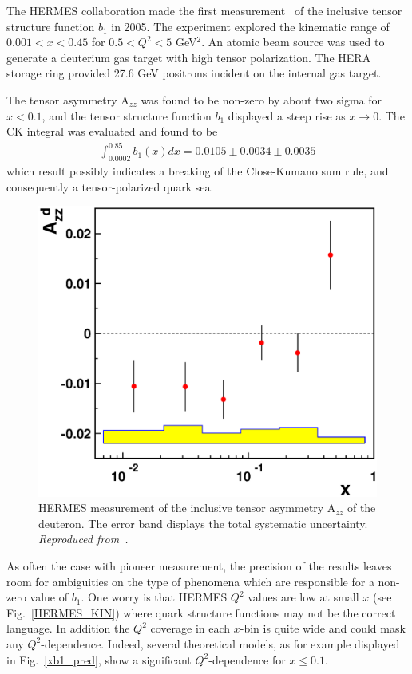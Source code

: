 \label{B1DATASECTION}
The HERMES collaboration  made the first measurement~\cite{Airapetian:2005cb} of
the inclusive tensor structure function $b_1$ in 2005.
The experiment explored the kinematic range of $0.001<x<0.45$ for  $0.5<Q^2<5$ GeV$^2$.  
An atomic beam source was used to generate a deuterium gas target with high tensor polarization.  
The HERA storage ring provided 27.6 GeV positrons incident on the internal gas target.

The tensor asymmetry A$_{zz}$  was found to be non-zero by about two sigma  for $x < 0.1$, and 
the tensor structure function  $b_1$ displayed a steep rise as $x\to 0$.
The CK integral was evaluated and found to be 
\begin{eqnarray}
\int_{0.0002}^{0.85} b_1(x) dx = 0.0105 \pm 0.0034 \pm 0.0035
\end{eqnarray}
which result possibly indicates a breaking of the Close-Kumano sum rule, and consequently a 
tensor-polarized quark sea.
%
%
\begin{figure}[h]
\begin{center}
\includegraphics[angle=0,width=4.in]{figs/azzfinal.eps}
\caption{\label{HERMES_AZZ} HERMES measurement of the inclusive tensor asymmetry A$_{zz}$ of the deuteron.  
The error band displays the total systematic uncertainty.
{\it Reproduced from~\cite{Riedl:2005jq}.}}
\end{center}\end{figure}

As often the case with pioneer measurement, the precision of the results leaves
room for ambiguities on the type of phenomena which are responsible for a non-zero 
value of $b_1$.
One worry is that HERMES $Q^2$ values are low at small $x$ (see Fig.~\ref{HERMES_KIN}) 
where quark structure functions may not be the correct language. In addition the $Q^2$ 
coverage in each $x$-bin is quite wide and could mask any $Q^2$-dependence.
Indeed, several theoretical models, as for example displayed in Fig.~\ref{xb1_pred},
show a significant $Q^2$-dependence for $x \le 0.1$.


